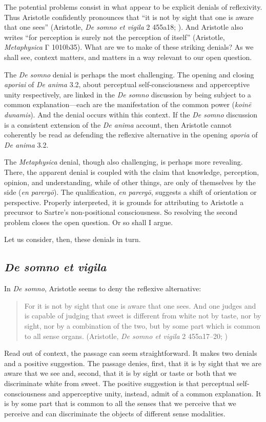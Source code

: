 The potential problems consist in what appear to be explicit denials of reflexivity. Thus Aristotle confidently pronounces that ``it is not by sight that one is aware that one sees'' (Aristotle, \emph{De somno et vigila} 2 455a18; \citealt[327]{Hett:1936fk}). And Aristotle also writes ``for perception is surely not the perception of itself'' (Aristotle, \emph{Metaphysica} {\sbl Γ} 1010b35). What are we to make of these striking denials? As we shall see, context matters, and matters in a way relevant to our open question.

The \emph{De somno} denial is perhaps the most challenging. The opening and closing \emph{aporiai} of \emph{De anima} 3.2, about perceptual self-consciousness and apperceptive unity respectively, are linked in the \emph{De somno} discussion by being subject to a common explanation—each are the manifestation of the common power (\emph{koinē dunamis}). And the denial occurs within this context. If the \emph{De somno} discussion is a consistent extension of the \emph{De anima} account, then Aristotle cannot coherently be read as defending the reflexive alternative in the opening \emph{aporia} of \emph{De anima} 3.2.

The \emph{Metaphysica} denial, though also challenging, is perhaps more revealing. There, the apparent denial is coupled with the claim that knowledge, perception, opinion, and understanding, while of other things, are only of themselves by the side (\emph{en parergō}). The qualification, \emph{en parergō}, suggests a shift of orientation or perspective. Properly interpreted, it is grounds for attributing to Aristotle a precursor to Sartre's non-positional consciousness. So resolving the second problem closes the open question. Or so shall I argue.

Let us consider, then, these denials in turn.

\subsection{\emph{De somno et vigila}} %
\label{sub:apperceptive_unity}

In \emph{De somno}, Aristotle seems to deny the reflexive alternative:
\begin{quote}
	For it is not by sight that one is aware that one sees. And one judges and is capable of judging that sweet is different from white not by taste, nor by sight, nor by a combination of the two, but by some part which is common to all sense organs. (Aristotle, \emph{De somno et vigila} 2 455a17–20; \citealt[327]{Hett:1936fk})
\end{quote}
Read out of context, the passage can seem straightforward. It makes two denials and a positive suggestion. The passage denies, first, that it is by sight that we are aware that we see and, second, that it is by sight or taste or both that we discriminate white from sweet. The positive suggestion is that perceptual self-consciousness and apperceptive unity, instead, admit of a common explanation. It is by some part that is common to all the senses that we perceive that we perceive and can discriminate the objects of different sense modalities.

